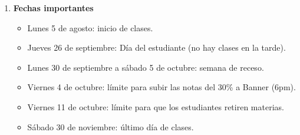 \documentclass[11pt]{article}
\begin{document}
\begin{enumerate}
\item \textbf{Fechas importantes}

\begin{itemize}
    \item Lunes 5 de agosto: inicio de clases.
    \item Jueves 26 de septiembre: Día del estudiante (no hay clases en la tarde).
    \item  Lunes 30 de septiembre a sábado 5 de octubre: semana de receso.
    \item  Viernes 4 de octubre: límite para subir las notas del 30\% a Banner (6pm).
    \item Viernes 11 de octubre: límite para que los estudiantes retiren materias.
    \item Sábado 30 de noviembre: último día de clases.
\end{itemize}

\nocite{*}




\end{enumerate}
\end{document}
